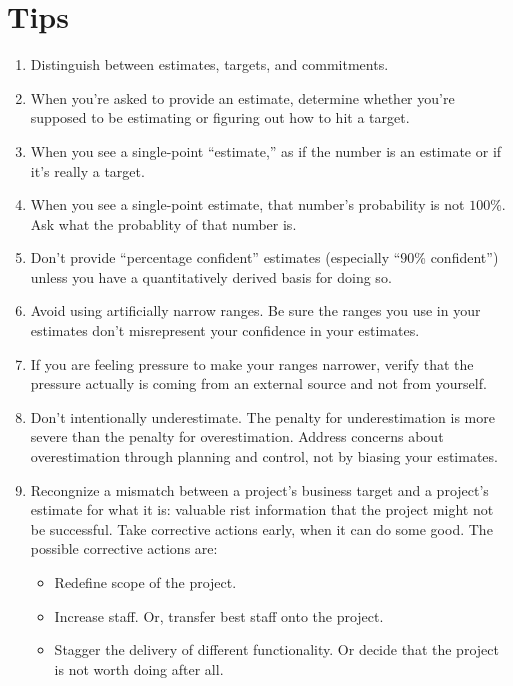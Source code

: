 \documentclass[12pt]{article}
\begin{document}
\section*{Tips}
\begin{enumerate}

\item Distinguish between estimates, targets, and commitments.
\item When you're asked to provide an estimate, determine whether you're supposed to be estimating or figuring out how to hit a target.
\item When you see a single-point ``estimate,'' as if the number is an estimate or if it's really a target.
\item When you see a single-point estimate, that number's probability is not $100$\%. Ask what the probablity of that number is.
\item Don't provide ``percentage confident'' estimates (especially ``$90$\% confident'') unless you have a quantitatively derived basis for doing so.

\item Avoid using artificially narrow ranges. Be sure the ranges you use in your estimates don't misrepresent your confidence in your estimates.

\item If you are feeling pressure to make your ranges narrower, verify that the pressure actually is coming from an external source and not from yourself.

\item Don't intentionally underestimate. The penalty for underestimation is more severe than the penalty for overestimation. Address concerns about overestimation through planning and control, not by biasing your estimates.

\item Recongnize a mismatch between a project's business target and a project's estimate for what it is: valuable rist information that the project might not be successful. Take corrective actions early, when it can do some good. The possible corrective actions are:
\begin{itemize}
	\item Redefine scope of the project.
	\item Increase staff. Or, transfer best staff onto the project.
	\item Stagger the delivery of different functionality. Or decide that the project is not worth doing after all.
\end{itemize}


\end{enumerate}
\end{document}
